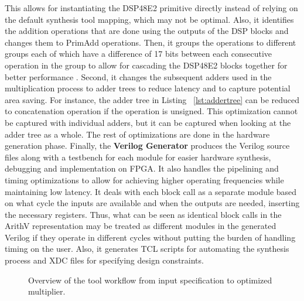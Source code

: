 This allows for instantiating the DSP48E2 primitive directly instead of relying on the default synthesis tool mapping, which may not be optimal.
Also, it identifies the addition operations that are done using the outputs of the DSP blocks and changes them to PrimAdd operations.
Then, it groups the operations to different groups each of which have a difference of 17 bits between each consecutive operation in the group to allow for cascading the DSP48E2 blocks together for better performance \cite{xilinxVirtex-4DSPExplainedFPGA}. 
Second, it changes the subsequent adders used in the multiplication process to adder trees to reduce latency and to capture potential area saving.
For instance, the adder tree in Listing ~\ref{lst:addertree} can be reduced to concatenation operation if the operation is unsigned.
This optimization cannot be captured with individual adders, but it can be captured when looking at the adder tree as a whole.
The rest of optimizations are done in the hardware generation phase.
Finally, the \textbf{Verilog Generator} produces the Verilog source files along with a testbench for each module for easier hardware synthesis, debugging and implementation on FPGA.
It also handles the pipelining and timing optimizations to allow for achieving higher operating frequencies while maintaining low latency. 
It deals with each block call as a separate module based on what cycle the inputs are available and when the outputs are needed, inserting the necessary registers. 
Thus, what can be seen as identical block calls in the ArithV representation may be treated as different modules in the generated Verilog if they operate in different cycles without putting the burden of handling timing on the user.
Also, it generates TCL scripts for automating the synthesis process and XDC files for specifying design constraints.


\begin{figure}[t]
    \centering
    \resizebox{\columnwidth}{!}{}
    \caption{Overview of the tool workflow from input specification to optimized multiplier.}
    \label{fig_tool_overview}
\end{figure} 

